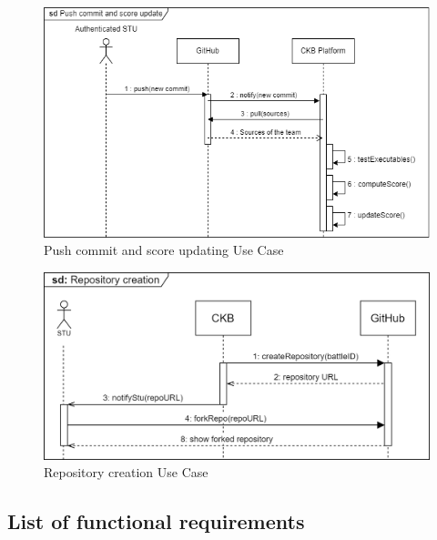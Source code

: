 \begin{figure}[H]
    \centering
    \includegraphics[width=1\textwidth]{images/sequence_diagrams/ClassDiagram-UC18-SequenceDiagram.png}
    \caption{Push commit and score updating Use Case}
    \label{fig:uc17}
\end{figure}
\begin{figure}[H]
    \centering
    \includegraphics[width=1\textwidth]{images/sequence_diagrams/.png/Repository_Creation - UC18.png}
    \caption{Repository creation Use Case}
    \label{fig:uc18}
\end{figure}

\newpage

\subsection{List of functional requirements}

